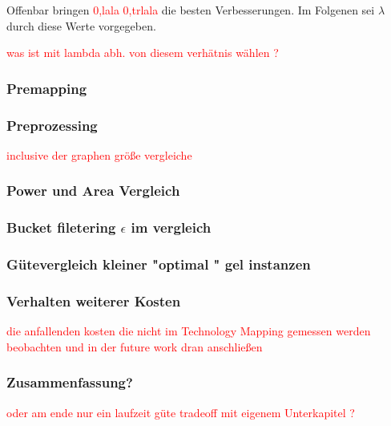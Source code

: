 \documentclass[11pt, a4paper, german]{article}
\newcommand{\TM}{Technology  Mapping }
\begin{document}
Offenbar bringen \textcolor{red}{0,lala  0,trlala} die besten Verbesserungen. Im Folgenen sei $\lambda$ durch diese Werte vorgegeben. 

\textcolor{red}{was ist mit lambda abh. von diesem verhätnis wählen ?}

\subsubsection{Premapping}

\subsubsection{Preprozessing}
\textcolor{red}{inclusive der graphen größe vergleiche}

\subsubsection{Power und Area Vergleich}

\subsubsection{Bucket filetering $\epsilon$ im vergleich }

\subsubsection{Gütevergleich kleiner "optimal " gel instanzen}
\label{subsubsec:guetevgl_kleiner_opt_instanzen}


\subsubsection{Verhalten weiterer Kosten}
\textcolor{red}{die anfallenden kosten die nicht im \TM gemessen werden beobachten und in der future work dran anschließen}

\subsubsection{Zusammenfassung?}
\textcolor{red}{oder am ende nur ein laufzeit güte tradeoff mit eigenem Unterkapitel ?} 
 
 
\end{document}
